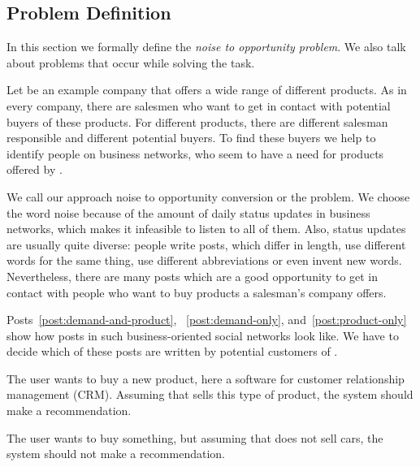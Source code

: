 \subsection{Problem Definition}
\label{sec:background-problem}

In this section we formally define the \emph{noise to opportunity problem}.
We also talk about problems that occur while solving the task.

Let \acme be an example company that offers a wide range of different products.
As in every company, there are salesmen who want to get in contact with potential buyers of these products.
For different products, there are different salesman responsible and different potential buyers.
To find these buyers we help \acme to identify people on business networks, who seem to have a need for products offered by \acme.

We call our approach noise to opportunity conversion or the \nto problem.
We choose the word noise because of the amount of daily status updates in business networks, which makes it infeasible to listen to all of them.
Also, status updates are usually quite diverse: people write posts, which differ in length, use different words for the same thing, use  different abbreviations or even invent new words.
Nevertheless, there are many posts which are a good opportunity to get in contact with people who want to buy products a salesman's company offers.

Posts~\ref{post:demand-and-product}, ~\ref{post:demand-only}, and~\ref{post:product-only} show how posts in such business-oriented social networks look like.
We have to decide which of these posts are written by potential customers of \acme.

\begin{post}
	\centering
	\caption{The user wants to buy a new product, here a software for customer relationship management (CRM). Assuming that \acme sells this type of product, the system should make a recommendation.}
	\label{post:demand-and-product}
\end{post}

\begin{post}
	\centering
	\caption{The user wants to buy something, but assuming that \acme does not sell cars, the system should not make a recommendation.}
	\label{post:demand-only}
\end{post}

